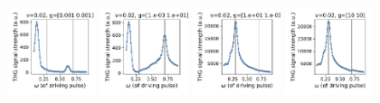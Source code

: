\documentclass[a4paper]{article}
\begin{document}
\begin{figure}[H]
  \centering
  \includegraphics[width=0.23\textwidth]{driving-v0-case0.pdf}
  \includegraphics[width=0.23\textwidth]{driving-v0-case1.pdf}
  \includegraphics[width=0.23\textwidth]{driving-v0-case2.pdf}
  \includegraphics[width=0.23\textwidth]{driving-v0-case3.pdf}
\end{figure}
\end{document}
